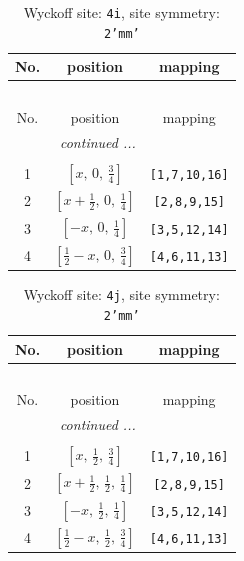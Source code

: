 \documentclass[fleqn,8pt]{jsarticle}
\begin{document}
\renewcommand{\arraystretch}{1.2}
\begin{longtable}{ccc}
\caption{Wyckoff site: {\tt 4i}, site symmetry: {\tt 2'mm'}}
 \\
 \hline \hline
No. & position & mapping \\ \hline \endfirsthead

\multicolumn{2}{l}{\tablename\ \thetable{}} \\
 \hline \hline
No. & position & mapping \\ \hline \endhead

 \hline \hline
\multicolumn{2}{r}{\footnotesize\it continued ...} \\ \endfoot

 \hline \hline
\multicolumn{2}{r}{} \\ \endlastfoot

1 & $\left[ x,\, 0,\, \frac{3}{4} \right]$ & {\tt [1,7,10,16]} \\ \hline
2 & $\left[ x + \frac{1}{2},\, 0,\, \frac{1}{4} \right]$ & {\tt [2,8,9,15]} \\ \hline
3 & $\left[ - x,\, 0,\, \frac{1}{4} \right]$ & {\tt [3,5,12,14]} \\ \hline
4 & $\left[ \frac{1}{2} - x,\, 0,\, \frac{3}{4} \right]$ & {\tt [4,6,11,13]} \\
\end{longtable}
\renewcommand{\arraystretch}{1.2}
\begin{longtable}{ccc}
\caption{Wyckoff site: {\tt 4j}, site symmetry: {\tt 2'mm'}}
 \\
 \hline \hline
No. & position & mapping \\ \hline \endfirsthead

\multicolumn{2}{l}{\tablename\ \thetable{}} \\
 \hline \hline
No. & position & mapping \\ \hline \endhead

 \hline \hline
\multicolumn{2}{r}{\footnotesize\it continued ...} \\ \endfoot

 \hline \hline
\multicolumn{2}{r}{} \\ \endlastfoot

1 & $\left[ x,\, \frac{1}{2},\, \frac{3}{4} \right]$ & {\tt [1,7,10,16]} \\ \hline
2 & $\left[ x + \frac{1}{2},\, \frac{1}{2},\, \frac{1}{4} \right]$ & {\tt [2,8,9,15]} \\ \hline
3 & $\left[ - x,\, \frac{1}{2},\, \frac{1}{4} \right]$ & {\tt [3,5,12,14]} \\ \hline
4 & $\left[ \frac{1}{2} - x,\, \frac{1}{2},\, \frac{3}{4} \right]$ & {\tt [4,6,11,13]} \\
\end{longtable}
\end{document}
